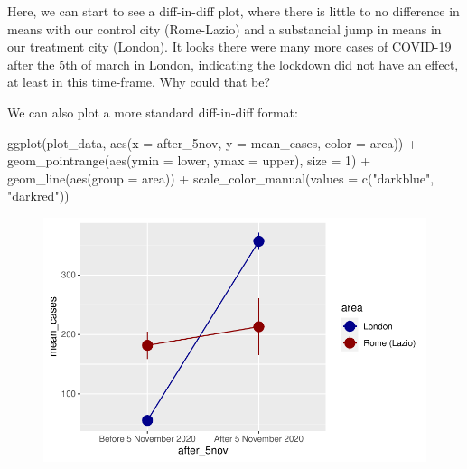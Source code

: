 \documentclass[
  letterpaper,
  DIV=11,
  numbers=noendperiod]{scrreprt}
\newenvironment{Shaded}{\begin{snugshade}}{\end{snugshade}}
\newcommand{\AttributeTok}[1]{\textcolor[rgb]{0.40,0.45,0.13}{#1}}
\newcommand{\DecValTok}[1]{\textcolor[rgb]{0.68,0.00,0.00}{#1}}
\newcommand{\FunctionTok}[1]{\textcolor[rgb]{0.28,0.35,0.67}{#1}}
\newcommand{\NormalTok}[1]{\textcolor[rgb]{0.00,0.23,0.31}{#1}}
\newcommand{\SpecialCharTok}[1]{\textcolor[rgb]{0.37,0.37,0.37}{#1}}
\newcommand{\StringTok}[1]{\textcolor[rgb]{0.13,0.47,0.30}{#1}}
\begin{document}
Here, we can start to see a diff-in-diff plot, where there is little to
no difference in means with our control city (Rome-Lazio) and a
substancial jump in means in our treatment city (London). It looks there
were many more cases of COVID-19 after the 5th of march in London,
indicating the lockdown did not have an effect, at least in this
time-frame. Why could that be?

We can also plot a more standard diff-in-diff format:

\begin{Shaded}
\begin{Highlighting}[]
\FunctionTok{ggplot}\NormalTok{(plot\_data, }\FunctionTok{aes}\NormalTok{(}\AttributeTok{x =}\NormalTok{ after\_5nov, }\AttributeTok{y =}\NormalTok{ mean\_cases, }\AttributeTok{color =}\NormalTok{ area)) }\SpecialCharTok{+}
  \FunctionTok{geom\_pointrange}\NormalTok{(}\FunctionTok{aes}\NormalTok{(}\AttributeTok{ymin =}\NormalTok{ lower, }\AttributeTok{ymax =}\NormalTok{ upper), }\AttributeTok{size =} \DecValTok{1}\NormalTok{) }\SpecialCharTok{+} 
  \FunctionTok{geom\_line}\NormalTok{(}\FunctionTok{aes}\NormalTok{(}\AttributeTok{group =}\NormalTok{ area)) }\SpecialCharTok{+}
  \FunctionTok{scale\_color\_manual}\NormalTok{(}\AttributeTok{values =} \FunctionTok{c}\NormalTok{(}\StringTok{"darkblue"}\NormalTok{, }\StringTok{"darkred"}\NormalTok{))}
\end{Highlighting}
\end{Shaded}

\begin{figure}[H]

{\centering \includegraphics{longitudinal-2_files/figure-pdf/unnamed-chunk-14-1.pdf}

}

\end{figure}
\end{document}
